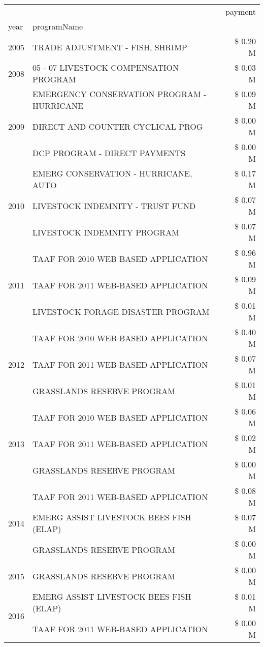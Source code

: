 \begin{tabular}{llr}
\toprule
 &  & payment \\
year & programName &  \\
\midrule
2005 & TRADE ADJUSTMENT - FISH, SHRIMP & \$ 0.20 M \\
\cline{1-3}
2008 & 05 - 07 LIVESTOCK COMPENSATION PROGRAM & \$ 0.03 M \\
\cline{1-3}
\multirow[t]{3}{*}{2009} & EMERGENCY CONSERVATION PROGRAM - HURRICANE & \$ 0.09 M \\
 & DIRECT AND COUNTER CYCLICAL PROG & \$ 0.00 M \\
 & DCP PROGRAM - DIRECT PAYMENTS & \$ 0.00 M \\
\cline{1-3}
\multirow[t]{3}{*}{2010} & EMERG CONSERVATION - HURRICANE, AUTO & \$ 0.17 M \\
 & LIVESTOCK INDEMNITY - TRUST FUND & \$ 0.07 M \\
 & LIVESTOCK INDEMNITY PROGRAM & \$ 0.07 M \\
\cline{1-3}
\multirow[t]{3}{*}{2011} & TAAF FOR 2010 WEB BASED APPLICATION & \$ 0.96 M \\
 & TAAF FOR 2011 WEB-BASED APPLICATION & \$ 0.09 M \\
 & LIVESTOCK FORAGE DISASTER PROGRAM & \$ 0.01 M \\
\cline{1-3}
\multirow[t]{3}{*}{2012} & TAAF FOR 2010 WEB BASED APPLICATION & \$ 0.40 M \\
 & TAAF FOR 2011 WEB-BASED APPLICATION & \$ 0.07 M \\
 & GRASSLANDS RESERVE PROGRAM & \$ 0.01 M \\
\cline{1-3}
\multirow[t]{3}{*}{2013} & TAAF FOR 2010 WEB BASED APPLICATION & \$ 0.06 M \\
 & TAAF FOR 2011 WEB-BASED APPLICATION & \$ 0.02 M \\
 & GRASSLANDS RESERVE PROGRAM & \$ 0.00 M \\
\cline{1-3}
\multirow[t]{3}{*}{2014} & TAAF FOR 2011 WEB-BASED APPLICATION & \$ 0.08 M \\
 & EMERG ASSIST LIVESTOCK BEES FISH (ELAP) & \$ 0.07 M \\
 & GRASSLANDS RESERVE PROGRAM & \$ 0.00 M \\
\cline{1-3}
2015 & GRASSLANDS RESERVE PROGRAM & \$ 0.00 M \\
\cline{1-3}
\multirow[t]{3}{*}{2016} & EMERG ASSIST LIVESTOCK BEES FISH (ELAP) & \$ 0.01 M \\
 & TAAF FOR 2011 WEB-BASED APPLICATION & \$ 0.00 M \\

\end{tabular}
